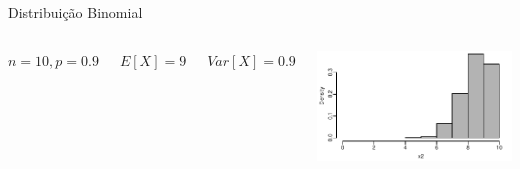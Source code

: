 \documentclass{beamer}\usepackage[]{graphicx}\usepackage[]{color}
\makeatletter
\def\maxwidth{ %
  \ifdim\Gin@nat@width>\linewidth
    \linewidth
  \else
    \Gin@nat@width
  \fi
}
\newenvironment{knitrout}{}{} %
\renewenvironment{knitrout}{\setlength{\topsep}{0mm}}{}
\makeatother
\begin{document}
\begin{frame}{Distribuição Binomial}

\begin{columns}[c]


$n = 10, p= 0.9$

\vfill

$E[X] = 9$

\vfill

$Var[X] = 0.9$


\begin{knitrout}\tiny
{}\color{fgcolor}
\includegraphics[width=\maxwidth]{figure/binom_plot2-1} 

\end{knitrout}

\end{columns}



\end{frame} 
\end{document}

